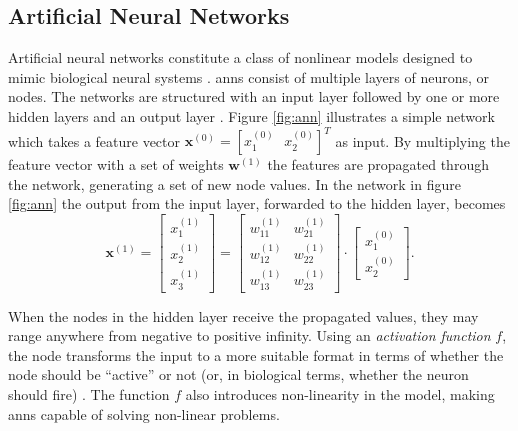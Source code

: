 

\subsection{Artificial Neural Networks}
Artificial neural networks constitute a class of nonlinear models designed to mimic biological neural systems \citep{rojas_1996}. \gls{ann}s consist of multiple layers of neurons, or nodes. The networks are structured with an input layer followed by one or more hidden layers and an output layer \citep{logan_2017}. Figure \ref{fig:ann} illustrates a simple network which takes a feature vector $\mathbf{x}^{(0)}=[x_1^{(0)}\text{ }  x_2^{(0)}]^{T}$ as input. By multiplying the feature vector with a set of weights $\mathbf{w}^{(1)}$ the features are propagated through the network, generating a set of new node values. In the network in figure \ref{fig:ann} the output from the input layer, forwarded to the hidden layer, becomes
\begin{equation}\label{eq:nn}
	\mathbf{x}^{(1)}=\begin{bmatrix}x_1^{(1)} \\ x_2^{(1)} \\ x_3^{(1)} \end{bmatrix} = 
	\begin{bmatrix} w_{11}^{(1)} & w_{21}^{(1)} \\ w_{12}^{(1)} & w_{22}^{(1)} \\ w_{13}^{(1)} & w_{23}^{(1)}\end{bmatrix}\cdot \begin{bmatrix}x_1^{(0)} \\ x_2^{(0)}\end{bmatrix}.
\end{equation}

When the nodes in the hidden layer receive the propagated values, they may range anywhere from negative to positive infinity. Using an \textit{activation function} $f$, the node transforms the input to a more suitable format in terms of whether the node should be ``active'' or not (or, in biological terms, whether the neuron should fire) \citep{kriesel_2007}. The function $f$ also introduces non-linearity in the model, making \gls{ann}s capable of solving non-linear problems. 

